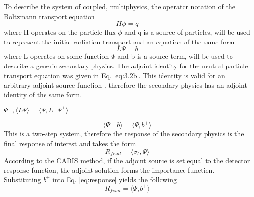 To describe the system of coupled, multiphysics,
the operator notation of the Boltzmann transport equation
\begin{equation}
	H\phi = q
\end{equation}
where H operates on the particle flux $\phi$ and q is a source of particles, 
will be used to represent the initial radiation transport and 
an equation of the same form 
\begin{equation}
	L\Psi = b
\end{equation}
where L operates on some function $\Psi$ and b is a source term, will be used
to describe a generic secondary physics. 
The adjoint identity for the neutral particle transport
equation was given in Eq. \ref{eq:3.2b}.
This identity is valid for an arbitrary adjoint source function
\cite{l_m}, therefore the secondary physics has an adjoint identity of the same
form.
\begin{center}
{$\Psi^{+}, \langle L\Psi \rangle = \langle \Psi, L^{+}\Psi^{+} \rangle $}
\end{center}
\begin{equation}\label{eq:adj_2_identity}
	\langle \Psi^{+}, b \rangle =
	\langle \Psi, b^{+} \rangle 
\end{equation}
This is a two-step system, therefore the response of the secondary physics 
is the final response of interest and takes the form
\begin{equation}\label{eq:response}
	R_{final} = \langle \sigma_b , \Psi \rangle
\end{equation}
According to the CADIS method, 
if the adjoint source is set equal to the detector response
function, the adjoint solution forms the importance function.
Substituting $b^{+}$ into Eq. \ref{eq:response} yields the following
 \begin{equation}\label{eq:response_2}
	 R_{final} = \langle \Psi, b^{+} \rangle 
 \end{equation}
